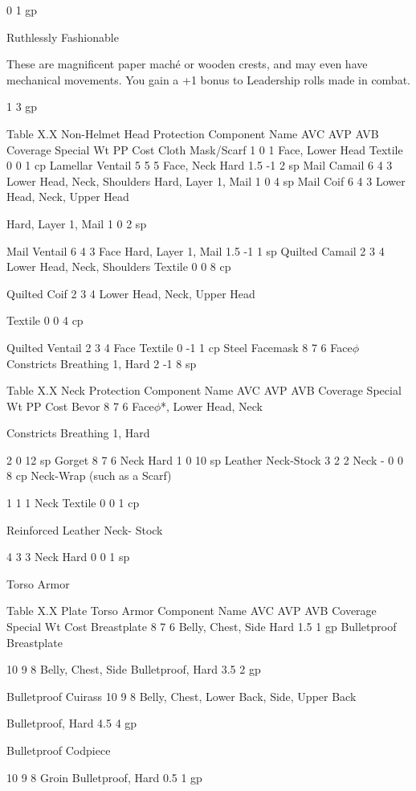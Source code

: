 \documentclass[oneside,11pt,english]{book}
\begin{document}
0 1 gp 

Ruthlessly 
Fashionable 

These are magnificent paper maché or wooden crests, and may even have mechanical 
movements. You gain a +1 bonus to Leadership rolls made in combat. 

1 3 gp 

 
Table X.X Non-Helmet Head Protection 
Component Name AVC AVP AVB Coverage Special Wt PP Cost 
Cloth Mask/Scarf 1 0 1 Face, Lower Head Textile 0 0 1 cp 
Lamellar Ventail 5 5 5 Face, Neck Hard 1.5 -1 2 sp 
Mail Camail 6 4 3 Lower Head, Neck, Shoulders Hard, Layer 1, Mail 1 0 4 sp 
Mail Coif 6 4 3 Lower Head, Neck, 
Upper Head 

Hard, Layer 1, Mail 1 0 2 sp 

Mail Ventail 6 4 3 Face Hard, Layer 1, Mail 1.5 -1 1 sp 
Quilted Camail 2 3 4 Lower Head, Neck, Shoulders Textile 0 0 8 cp 


Quilted Coif 2 3 4 Lower Head, Neck, 
Upper Head 

Textile 0 0 4 cp 

Quilted Ventail 2 3 4 Face Textile 0 -1 1 cp 
Steel Facemask 8 7 6 Face$\phi$ Constricts Breathing 1, Hard 2 -1 8 sp 

 
Table X.X Neck Protection 
Component Name AVC AVP AVB Coverage Special Wt PP Cost 
Bevor 8 7 6 Face$\phi$*, Lower Head, 
Neck 

Constricts Breathing 1, 
Hard 

2 0 12 
sp 
Gorget 8 7 6 Neck Hard 1 0 10 
sp 
Leather Neck-Stock 3 2 2 Neck - 0 0 8 cp 
Neck-Wrap (such as a 
Scarf) 

1 1 1 Neck Textile 0 0 1 cp 

Reinforced Leather Neck-
Stock 

4 3 3 Neck Hard 0 0 1 sp 

 

Torso Armor 

 

Table X.X Plate Torso Armor 
Component Name AVC AVP AVB Coverage Special Wt Cost 
Breastplate 8 7 6 Belly, Chest, Side Hard 1.5 1 gp 
Bulletproof 
Breastplate 

10 9 8 Belly, Chest, Side Bulletproof, Hard 3.5 2 gp 

Bulletproof Cuirass 10 9 8 Belly, Chest, Lower Back, Side, 
Upper Back 

Bulletproof, Hard 4.5 4 gp 

Bulletproof 
Codpiece 

10 9 8 Groin Bulletproof, Hard 0.5 1 gp 
\end{document}
